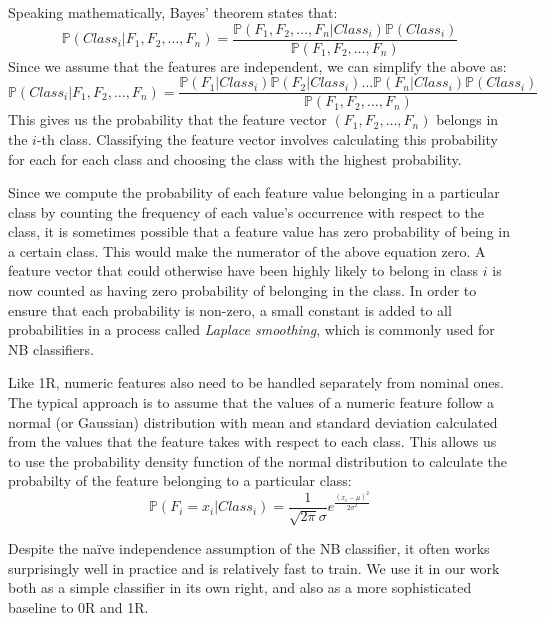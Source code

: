 Speaking mathematically, Bayes' theorem states that:
\begin{equation*}
\mathbb{P}(Class_i|F_1,F_2,\ldots,F_n) =
  \dfrac{\mathbb{P}(F_1,F_2,\ldots,F_n|Class_i)\mathbb{P}(Class_i)}{\mathbb{P}(F_1,F_2,\ldots,F_n)}
\end{equation*}
Since we assume that the features are independent, we can simplify the above as:
\begin{equation*}
\mathbb{P}(Class_i|F_1,F_2,\ldots,F_n) =
\dfrac{\mathbb{P}(F_1|Class_i)\mathbb{P}(F_2|Class_i)\ldots \mathbb{P}(F_n|Class_i)\mathbb{P}(Class_i)}{\mathbb{P}(F_1,F_2,\ldots,F_n)}
\end{equation*}
This gives us the probability that the feature vector $(F_1,F_2,\ldots,F_n)$
belongs in the $i$-th class. Classifying the feature vector involves
calculating this probability for each for each class and choosing the class
with the highest probability.

Since we compute the probability of each feature value belonging in a
particular class by counting the frequency of each value's occurrence with
respect to the class, it is sometimes possible that a feature value has zero
probability of being in a certain class. This would make the numerator of the
above equation zero. A feature vector that could otherwise have been highly
likely to belong in class $i$ is now counted as having zero probability of
belonging in the class. In order to ensure that each probability is non-zero,
a small constant is added to all probabilities in a process called
\textit{Laplace smoothing}, which is commonly used for NB classifiers.

Like 1R, numeric features also need to be handled separately from nominal ones.
The typical approach is to assume that the values of a numeric feature follow a
normal (or Gaussian) distribution with mean and standard deviation calculated
from the values that the feature takes with respect to each class.
This allows us to use the probability
density function of the normal distribution to calculate the probabilty of the
feature belonging to a particular class:
\begin{equation*}
\mathbb{P}(F_i=x_i|Class_i) =
  \dfrac{1}{\sqrt{2\pi}\sigma}e^\frac{(x_i-\mu)^2}{2\sigma^2}
\end{equation*}

Despite the na\"{i}ve independence assumption of the NB classifier, it often
works surprisingly well in practice and is relatively fast to train. We use it
in our work both as a simple classifier in its own right, and also as a more
sophisticated baseline to 0R and 1R.

